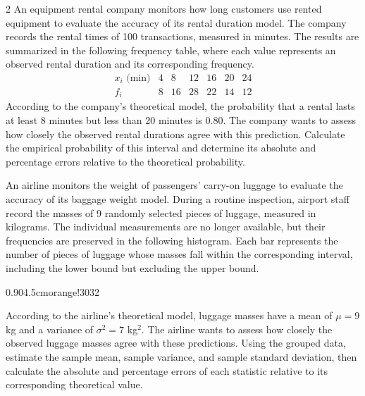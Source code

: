 \begin{multicols}{2}
\label{sec:c6-4}
An equipment rental company monitors how long customers use rented
equipment to evaluate the accuracy of its rental duration model.
The company records the rental times of 100 transactions, measured
in minutes. The results are summarized in the following frequency
table, where each value represents an observed rental duration
and its corresponding frequency.
\[
\begin{array}{c|rrrrrr}
	x_i\text{ (min)}&4&8&12&16&20&24\\\hline
	f_i&8&16&28&22&14&12
\end{array}
\]
According to the company's theoretical model, the probability that
a rental lasts at least 8 minutes but less than 20 minutes is 0.80.
The company wants to assess how closely the observed rental durations
agree with this prediction. Calculate the empirical probability
of this interval and determine its absolute and percentage errors
relative to the theoretical probability. 

\label{sec:c7-1}
An airline monitors the weight of passengers' carry-on luggage to
evaluate the accuracy of its baggage weight model. During a routine
inspection, airport staff record the masses of 9 randomly selected
pieces of luggage, measured in kilograms. The individual measurements
are no longer available, but their frequencies are preserved in the
following histogram. Each bar represents the number of pieces of
luggage whose masses fall within the corresponding interval,
including the lower bound but excluding the upper bound.
\begin{center}
	{0.90\linewidth}{4.5cm}{orange!30}{3}{2}
\end{center}
According to the airline's theoretical model, luggage masses have
a mean of $\mu=9$ kg and a variance of $\sigma^2=7$ kg$^2$.
The airline wants to assess how closely the observed luggage
masses agree with these predictions. Using the grouped data,
estimate the sample mean, sample variance, and sample standard
deviation, then calculate the absolute and percentage errors
of each statistic relative to its corresponding theoretical value. 




\end{multicols}
